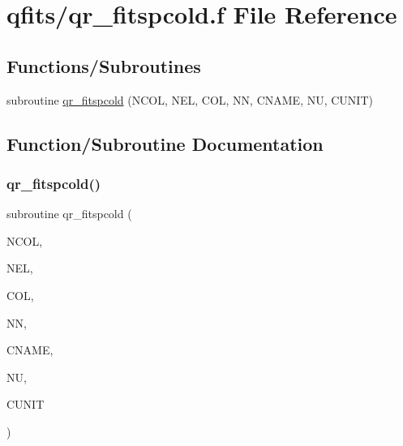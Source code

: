 \hypertarget{qr__fitspcold_8f}{}\section{qfits/qr\+\_\+fitspcold.f File Reference}
\label{qr__fitspcold_8f}
\subsection*{Functions/\+Subroutines}
\begin{DoxyCompactItemize}
\item 
subroutine \hyperlink{qr__fitspcold_8f_a50856a0f9cc259bb47e2d9c4d8cd272e}{qr\+\_\+fitspcold} (N\+C\+OL, N\+EL, C\+OL, NN, C\+N\+A\+ME, NU, C\+U\+N\+IT)
\end{DoxyCompactItemize}


\subsection{Function/\+Subroutine Documentation}
\mbox{\label{qr__fitspcold_8f_a50856a0f9cc259bb47e2d9c4d8cd272e}} 
\subsubsection{\texorpdfstring{qr\+\_\+fitspcold()}{qr\_fitspcold()}}
{\footnotesize\ttfamily subroutine qr\+\_\+fitspcold (\begin{DoxyParamCaption}\item[{integer}]{N\+C\+OL,  }\item[{integer}]{N\+EL,  }\item[{double precision, dimension(nel)}]{C\+OL,  }\item[{integer}]{NN,  }\item[{character$\ast$(nn)}]{C\+N\+A\+ME,  }\item[{integer}]{NU,  }\item[{character$\ast$(nu)}]{C\+U\+N\+IT }\end{DoxyParamCaption})}

